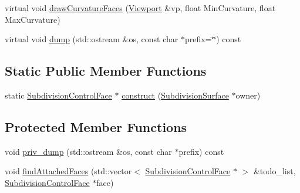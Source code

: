 \begin{DoxyCompactItemize}
\item 
virtual void \hyperlink{classShipCADGeometry_1_1SubdivisionControlFace_aaf9226150996743d8d2ea560083ad1d8}{draw\-Curvature\-Faces} (\hyperlink{classShipCADGeometry_1_1Viewport}{Viewport} \&vp, float Min\-Curvature, float Max\-Curvature)
\item 
virtual void \hyperlink{classShipCADGeometry_1_1SubdivisionControlFace_a947868fba3e9bb6c587847fb9245c9ff}{dump} (std\-::ostream \&os, const char $\ast$prefix=\char`\"{}\char`\"{}) const 
\end{DoxyCompactItemize}
\subsection*{Static Public Member Functions}
\begin{DoxyCompactItemize}
\item 
static \hyperlink{classShipCADGeometry_1_1SubdivisionControlFace}{Subdivision\-Control\-Face} $\ast$ \hyperlink{classShipCADGeometry_1_1SubdivisionControlFace_a4117f55ab3ec27bebd933f2992bc5dcd}{construct} (\hyperlink{classShipCADGeometry_1_1SubdivisionSurface}{Subdivision\-Surface} $\ast$owner)
\end{DoxyCompactItemize}
\subsection*{Protected Member Functions}
\begin{DoxyCompactItemize}
\item 
void \hyperlink{classShipCADGeometry_1_1SubdivisionControlFace_a224ce57a8d9d631eef63cccd8e0113f9}{priv\-\_\-dump} (std\-::ostream \&os, const char $\ast$prefix) const 
\item 
void \hyperlink{classShipCADGeometry_1_1SubdivisionControlFace_aa6035e53cd1e32a9bd9e9f9800c9f7d4}{find\-Attached\-Faces} (std\-::vector$<$ \hyperlink{classShipCADGeometry_1_1SubdivisionControlFace}{Subdivision\-Control\-Face} $\ast$ $>$ \&todo\-\_\-list, \hyperlink{classShipCADGeometry_1_1SubdivisionControlFace}{Subdivision\-Control\-Face} $\ast$face)
\end{DoxyCompactItemize}
